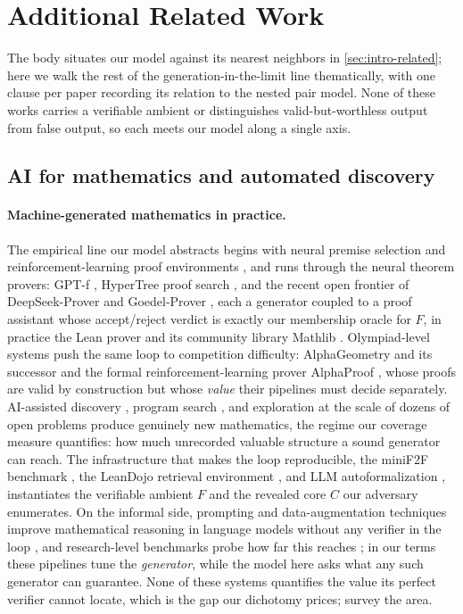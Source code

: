 \documentclass[11pt]{article}
\numberwithin{equation}{section}
\newcommand{\Amb}{F}
\newcommand{\Core}{C}
\theoremstyle{plain}
\theoremstyle{definition}
\theoremstyle{remark}
\begin{document}
\section{Additional Related Work}
\label{app:related}

The body situates our model against its nearest neighbors in \cref{sec:intro-related}; here we
walk the rest of the generation-in-the-limit line thematically, with one clause per paper
recording its relation to the nested pair model. None of these works carries a verifiable
ambient or distinguishes valid-but-worthless output from false output, so each meets our model
along a single axis.

\subsection{AI for mathematics and automated discovery}
\paragraph{Machine-generated mathematics in practice.}
The empirical line our model abstracts begins with neural premise selection
\citep{irving2016deepmath} and reinforcement-learning proof environments
\citep{bansal2019holist}, and runs through the neural theorem provers: GPT-f
\citep{polu2020gptf}, HyperTree proof search \citep{lample2022hypertree}, and the recent open
frontier of DeepSeek-Prover \citep{deepseek2024prover} and Goedel-Prover
\citep{lin2025goedel}, each a generator coupled to a proof assistant whose accept/reject
verdict is exactly our membership oracle for $\Amb$, in practice the Lean prover and its
community library Mathlib \citep{demoura2015lean,demoura2021lean4,mathlib2020}. Olympiad-level
systems push the same loop to competition difficulty: AlphaGeometry and its successor
\citep{trinh2024alphageometry,chervonyi2025alphageometry2} and the formal
reinforcement-learning prover AlphaProof \citep{hubert2026alphaproof}, whose proofs are valid
by construction but whose \emph{value} their pipelines must decide separately. AI-assisted
discovery \citep{davies2021advancing}, program search \citep{romera2024funsearch}, and
exploration at the scale of dozens of open problems \citep{georgiev2025exploration} produce
genuinely new mathematics, the regime our coverage measure quantifies: how much unrecorded
valuable structure a sound generator can reach. The infrastructure that makes the loop
reproducible, the miniF2F benchmark \citep{zheng2022minif2f}, the LeanDojo retrieval
environment \citep{yang2023leandojo}, and LLM autoformalization
\citep{wu2022autoformalization,jiang2023draft}, instantiates the verifiable ambient $\Amb$ and
the revealed core $\Core$ our adversary enumerates. On the informal side, prompting and
data-augmentation techniques improve mathematical reasoning in language models without any
verifier in the loop \citep{imani2023mathprompter,yu2024metamath}, and research-level
benchmarks probe how far this reaches \citep{zhang2025realmath}; in our terms these pipelines
tune the \emph{generator}, while the model here asks what any such generator can guarantee.
None of these systems quantifies the value its perfect verifier cannot locate, which is the
gap our dichotomy prices; \citet{li2024survey,ahn2024large,ju2026ai} survey the area.
\end{document}
